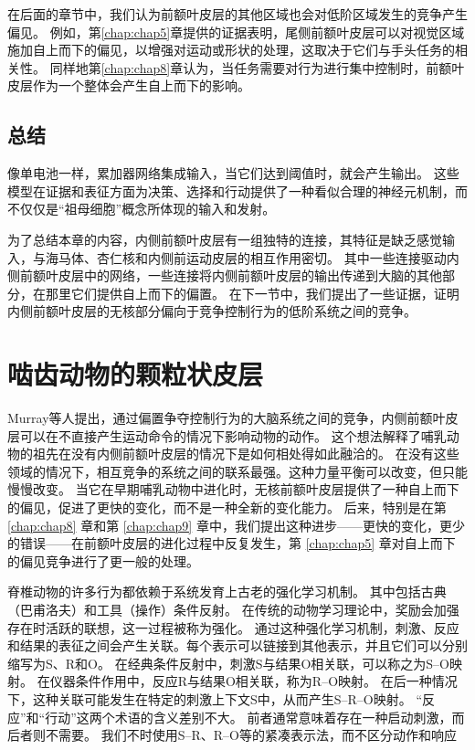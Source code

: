 在后面的章节中，我们认为前额叶皮层的其他区域也会对低阶区域发生的竞争产生偏见。
例如，第\ref{chap:chap5}章提供的证据表明，尾侧前额叶皮层可以对视觉区域施加自上而下的偏见，以增强对运动或形状的处理，这取决于它们与手头任务的相关性。
同样地第\ref{chap:chap8}章认为，当任务需要对行为进行集中控制时，前额叶皮层作为一个整体会产生自上而下的影响。\par



\subsection{总结}

像单电池一样，累加器网络集成输入，当它们达到阈值时，就会产生输出。
这些模型在证据和表征方面为决策、选择和行动提供了一种看似合理的神经元机制，而不仅仅是“祖母细胞”概念所体现的输入和发射。\par


为了总结本章的内容，内侧前额叶皮层有一组独特的连接，其特征是缺乏感觉输入，与海马体、杏仁核和内侧前运动皮层的相互作用密切。
其中一些连接驱动内侧前额叶皮层中的网络，一些连接将内侧前额叶皮层的输出传递到大脑的其他部分，在那里它们提供自上而下的偏置。
在下一节中，我们提出了一些证据，证明内侧前额叶皮层的无核部分偏向于竞争控制行为的低阶系统之间的竞争。\par



\section{啮齿动物的颗粒状皮层}

Murray等人\cite{murray2011can}提出，通过偏置争夺控制行为的大脑系统之间的竞争，内侧前额叶皮层可以在不直接产生运动命令的情况下影响动物的动作。
这个想法解释了哺乳动物的祖先在没有内侧前额叶皮层的情况下是如何相处得如此融洽的。
在没有这些领域的情况下，相互竞争的系统之间的联系最强。这种力量平衡可以改变，但只能慢慢改变。
当它在早期哺乳动物中进化时，无核前额叶皮层提供了一种自上而下的偏见，促进了更快的变化，而不是一种全新的变化能力。
后来，特别是在第 \ref{chap:chap8} 章和第 \ref{chap:chap9} 章中，我们提出这种进步——更快的变化，更少的错误——在前额叶皮层的进化过程中反复发生，第 \ref{chap:chap5} 章对自上而下的偏见竞争进行了更一般的处理。\par


脊椎动物的许多行为都依赖于系统发育上古老的强化学习机制。
其中包括古典（巴甫洛夫）和工具（操作）条件反射\cite{Dickinson 1980}。
在传统的动物学习理论中，奖励会加强存在时活跃的联想，这一过程被称为强化。
通过这种强化学习机制，刺激、反应和结果的表征之间会产生关联。每个表示可以链接到其他表示，并且它们可以分别缩写为S、R和O。
在经典条件反射中，刺激S与结果O相关联，可以称之为S–O映射。
在仪器条件作用中，反应R与结果O相关联，称为R–O映射。
在后一种情况下，这种关联可能发生在特定的刺激上下文S中，从而产生S–R–O映射。
“反应”和“行动”这两个术语的含义差别不大。
前者通常意味着存在一种启动刺激，而后者则不需要。
我们不时使用S–R、R–O等的紧凑表示法，而不区分动作和响应\par



